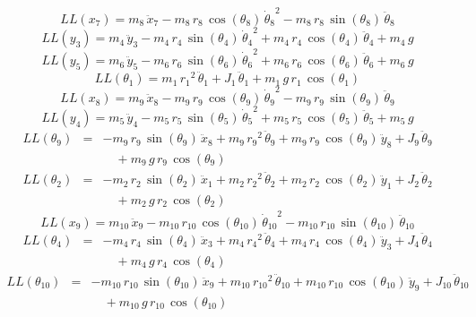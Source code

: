 \[ LL(x_{7}) = m_{8}\,{\ddot{x}_{7}} - m_{8}\,r_{8}\,\cos({\theta_{8}}
)\,{{\dot{\theta}_{8}}}^2 - m_{8}\,r_{8}\,\sin({\theta_{8}})\,{
\ddot{\theta}_{8}} \]
\[ LL(y_{3}) = m_{4}\,{\ddot{y}_{3}} - m_{4}\,r_{4}\,\sin({\theta_{4}}
)\,{{\dot{\theta}_{4}}}^2 + m_{4}\,r_{4}\,\cos({\theta_{4}})\,{
\ddot{\theta}_{4}} + m_{4}\,g \]
\[ LL(y_{5}) = m_{6}\,{\ddot{y}_{5}} - m_{6}\,r_{6}\,\sin({\theta_{6}}
)\,{{\dot{\theta}_{6}}}^2 + m_{6}\,r_{6}\,\cos({\theta_{6}})\,{
\ddot{\theta}_{6}} + m_{6}\,g \]
\[ LL({\theta_{1}}) = m_{1}\,{r_{1}}^2\,{\ddot{\theta}_{1}} + J_{1}\,{
\ddot{\theta}_{1}} + m_{1}\,g\,r_{1}\,\cos({\theta_{1}}) \]
\[ LL(x_{8}) = m_{9}\,{\ddot{x}_{8}} - m_{9}\,r_{9}\,\cos({\theta_{9}}
)\,{{\dot{\theta}_{9}}}^2 - m_{9}\,r_{9}\,\sin({\theta_{9}})\,{
\ddot{\theta}_{9}} \]
\[ LL(y_{4}) = m_{5}\,{\ddot{y}_{4}} - m_{5}\,r_{5}\,\sin({\theta_{5}}
)\,{{\dot{\theta}_{5}}}^2 + m_{5}\,r_{5}\,\cos({\theta_{5}})\,{
\ddot{\theta}_{5}} + m_{5}\,g \]
\begin{eqnarray*} LL({\theta_{9}}) &=& -m_{9}\,r_{9}\,\sin({\theta_{9}
})\,{\ddot{x}_{8}} + m_{9}\,{r_{9}}^2\,{\ddot{\theta}_{9}} + m_{9}\,r
_{9}\,\cos({\theta_{9}})\,{\ddot{y}_{8}} + J_{9}\,{\ddot{\theta}_{9}}
 \\ &&\quad\mbox{} + m_{9}\,g\,r_{9}\,\cos({\theta_{9}})
 \end{eqnarray*}
\begin{eqnarray*} LL({\theta_{2}}) &=& -m_{2}\,r_{2}\,\sin({\theta_{2}
})\,{\ddot{x}_{1}} + m_{2}\,{r_{2}}^2\,{\ddot{\theta}_{2}} + m_{2}\,r
_{2}\,\cos({\theta_{2}})\,{\ddot{y}_{1}} + J_{2}\,{\ddot{\theta}_{2}}
 \\ &&\quad\mbox{} + m_{2}\,g\,r_{2}\,\cos({\theta_{2}})
 \end{eqnarray*}
\[ LL(x_{9}) = m_{10}\,{\ddot{x}_{9}} - m_{10}\,r_{10}\,\cos({\theta_{
10}})\,{{\dot{\theta}_{10}}}^2 - m_{10}\,r_{10}\,\sin({\theta_{10}})\,
{\ddot{\theta}_{10}} \]
\begin{eqnarray*} LL({\theta_{4}}) &=& -m_{4}\,r_{4}\,\sin({\theta_{4}
})\,{\ddot{x}_{3}} + m_{4}\,{r_{4}}^2\,{\ddot{\theta}_{4}} + m_{4}\,r
_{4}\,\cos({\theta_{4}})\,{\ddot{y}_{3}} + J_{4}\,{\ddot{\theta}_{4}}
 \\ &&\quad\mbox{} + m_{4}\,g\,r_{4}\,\cos({\theta_{4}})
 \end{eqnarray*}
\begin{eqnarray*} LL({\theta_{10}}) &=& -m_{10}\,r_{10}\,\sin({\theta
_{10}})\,{\ddot{x}_{9}} + m_{10}\,{r_{10}}^2\,{\ddot{\theta}_{10}} + m
_{10}\,r_{10}\,\cos({\theta_{10}})\,{\ddot{y}_{9}} + J_{10}\,{
\ddot{\theta}_{10}} \\ &&\quad\mbox{} + m_{10}\,g\,r_{10}\,\cos({
\theta_{10}}) \end{eqnarray*}
